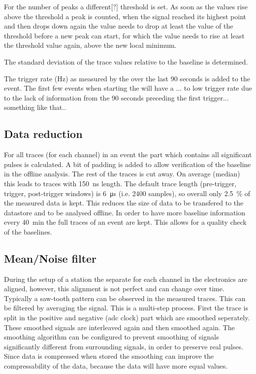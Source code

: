 For the number of peaks a different[?] threshold is set. As soon as the values rise above the threshold a peak is counted, when the signal reached its highest point and then drops down again the value needs to drop at least the value of the threshold before a new peak can start, for which the value needs to rise at least the threshold value again, above the new local minimum.

The standard deviation of the trace values relative to the baseline is determined.

The trigger rate (Hz) as measured by the \daq over the last 90 seconds is added to the event. The first few events when starting the \daq will have a ... to low trigger rate due to the lack of information from the 90 seconds preceding the first trigger... something like that..


\subsection{Data reduction}

\cite{oostenbrugge2014daq}

For all traces (for each channel) in an event the part which contains all significant pulses is calculated. A bit of padding is added to allow verification of the baseline in the offline analysis. The rest of the traces is cut away. On average (median) this leads to traces with \SI{150}{\ns} length. The default trace length (pre-trigger, trigger, post-trigger windows) is \SI{6}{\micro\second} (i.e. 2400 samples), so overall only \SI{2.5}{\percent} of the measured data is kept. This reduces the size of data to be transfered to the datastore and to be analysed offline. In order to have more baseline information every \SI{40}{\minute} the full traces of an event are kept. This allows for a quality check of the baselines.



\subsection{Mean/Noise filter}

During the setup of a station the separate \adcs for each channel in the \hisparc electronics are aligned, however, this alignment is not perfect and can change over time. Typically a saw-tooth pattern can be observed in the measured traces. This can be filtered by averaging the signal. This is a multi-step process. First the trace is split in the positive and negative (adc clock) part which are smoothed seperately. These smoothed signals are interleaved again and then smoothed again. The smoothing algorithm can be configured to prevent smoothing of signals significantly different from surrounding signals, in order to preserve real pulses. Since data is compressed when stored the smoothing can improve the compressability of the data, because the data will have more equal values.


